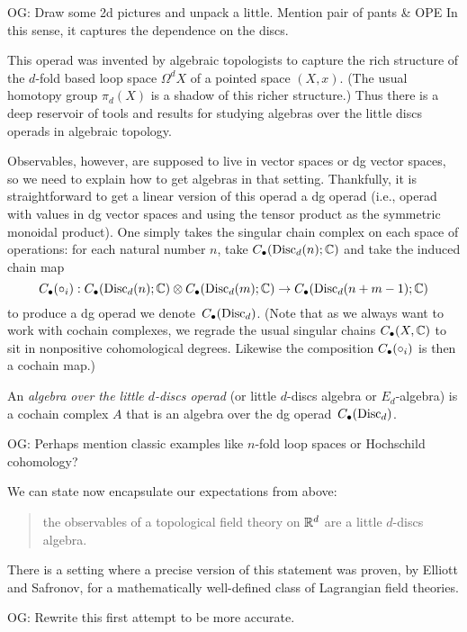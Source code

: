 \documentclass[11pt]{amsart}
\def\owen#1{{\textcolor{violet!50!black}{OG: {#1}}}}
\begin{document}
\owen{Draw some 2d pictures and unpack a little. Mention pair of pants \& OPE} 
In this sense, it captures the dependence on the discs.

This operad was invented by algebraic topologists to capture the rich structure of the $d$-fold based loop space $\Omega^d X$ of a pointed space $(X,x)$.
(The usual homotopy group $\pi_d(X)$ is a shadow of this richer structure.)
Thus there is a deep reservoir of tools and results for studying algebras over the little discs operads in algebraic topology.

Observables, however, are supposed to live in vector spaces or dg vector spaces,
so we need to explain how to get algebras in that setting.
Thankfully, it is straightforward to get a linear version of this operad a dg operad (i.e., operad with values in dg vector spaces and using the tensor product as the symmetric monoidal product).
One simply takes the singular chain complex on each space of operations:
for each natural number $n$, take $C_\bullet({\rm Disc}_d(n); \mathbb C)$ and take the induced chain map 
\[
C_\bullet(\circ_i): C_\bullet({\rm Disc}_d(n); \mathbb C) \otimes C_\bullet({\rm Disc}_d(m); \mathbb C) \to C_\bullet({\rm Disc}_d(n+m-1); \mathbb C)
\]
to produce a dg operad we denote~$C_\bullet({\rm Disc}_d)$.
(Note that as we always want to work with cochain complexes, we regrade the usual singular chains $C_\bullet(X, \mathbb C)$ to sit in nonpositive cohomological degrees. 
Likewise the composition $C_\bullet(\circ_i)$ is then a cochain map.)

\begin{dfn}
An {\em algebra over the little $d$-discs operad} (or little $d$-discs algebra or $E_d$-algebra) is a cochain complex $A$ that is an algebra over the dg operad~$C_\bullet({\rm Disc}_d)$.
\end{dfn}

\owen{Perhaps mention classic examples like $n$-fold loop spaces or Hochschild cohomology?}

We can state now encapsulate our expectations from above:
\begin{quote}
the observables of a topological field theory on $\mathbb R^d$ are a little $d$-discs algebra.
\end{quote}
There is a setting where a precise version of this statement was proven, by Elliott and Safronov, for a mathematically well-defined class of Lagrangian field theories.

\owen{Rewrite this first attempt to be more accurate.}
\end{document}
